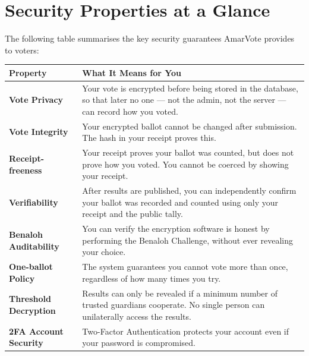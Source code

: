 \documentclass[12pt,a4paper,openany]{book}
\begin{document}
\chapter{Security Properties at a Glance}

The following table summarises the key security guarantees AmarVote provides to voters:

\begin{center}
	\begin{tabularx}{0.95\textwidth}{>{\bfseries}l X}
		\toprule
		\rowcolor{primaryblue}\color{white}Property & \color{white}What It Means for You\\
		\midrule
		\rowcolor{lightgray}Vote Privacy & Your vote is encrypted before being stored in the database, so that later no one --- not the admin, not the server --- can record how you voted.\\
		Vote Integrity & Your encrypted ballot cannot be changed after submission. The hash in your receipt proves this.\\
		\rowcolor{lightgray}Receipt-freeness & Your receipt proves your ballot was counted, but does not prove how you voted. You cannot be coerced by showing your receipt.\\
		Verifiability & After results are published, you can independently confirm your ballot was recorded and counted using only your receipt and the public tally.\\
		\rowcolor{lightgray}Benaloh Auditability & You can verify the encryption software is honest by performing the Benaloh Challenge, without ever revealing your choice.\\
		One-ballot Policy & The system guarantees you cannot vote more than once, regardless of how many times you try.\\
		\rowcolor{lightgray}Threshold Decryption & Results can only be revealed if a minimum number of trusted guardians cooperate. No single person can unilaterally access the results.\\
		2FA Account Security & Two-Factor Authentication protects your account even if your password is compromised.\\
		\bottomrule
	\end{tabularx}
\end{center}
\end{document}
